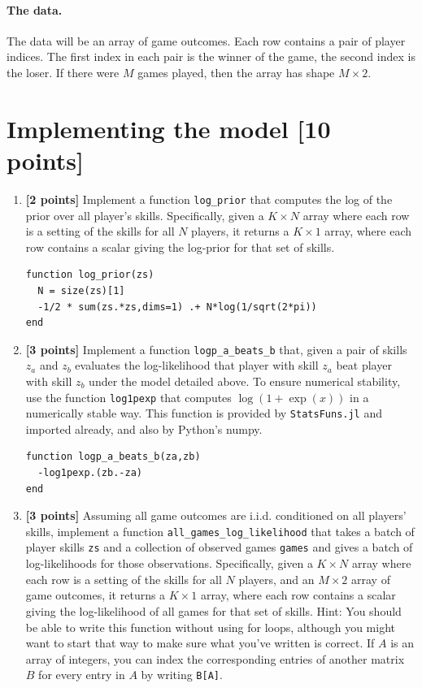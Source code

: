 \documentclass{article}
\begin{document}
\paragraph{The data.}
The data will be an array of game outcomes.
Each row contains a pair of player indices.
The first index in each pair is the winner of the game, the second index is the loser.
If there were $M$ games played, then the array has shape $M \times 2$.

\pagebreak
\section{Implementing the model [10 points]}
\begin{enumerate}[label=(\alph*)]
	\item {\bf [2 points]} Implement a function \texttt{log\_prior} that computes the log of the prior over all player's skills.
          Specifically, given a $K \times N$ array where each row is a setting of the skills for all $N$ players, it returns a $K \times 1$ array, where each row contains a scalar giving the log-prior for that set of skills.

\begin{verbatim}
function log_prior(zs)
  N = size(zs)[1]
  -1/2 * sum(zs.*zs,dims=1) .+ N*log(1/sqrt(2*pi))
end
\end{verbatim}
          
  \item {\bf [3 points]} Implement a function \texttt{logp\_a\_beats\_b} that, given a pair of skills $z_a$ and $z_b$
    evaluates the log-likelihood that player with skill $z_a$ beat player with skill $z_b$ under the model detailed above.
    To ensure numerical stability, use the function  \texttt{log1pexp} that computes $\log(1 + \exp(x))$ in a numerically stable way.
    This function is provided by \texttt{StatsFuns.jl} and imported already, and also by Python's numpy.

\begin{verbatim}
function logp_a_beats_b(za,zb)
  -log1pexp.(zb.-za)
end
\end{verbatim}
    
  \item {\bf [3 points]} Assuming all game outcomes are i.i.d. conditioned on all players' skills, implement a function \texttt{all\_games\_log\_likelihood} that takes a batch of player skills \texttt{zs} and a collection of observed games \texttt{games} and gives a batch of log-likelihoods for those observations.
  Specifically, given a $K \times N$ array where each row is a setting of the skills for all $N$ players, and an $M \times 2$ array of game outcomes, it returns a $K \times 1$ array, where each row contains a scalar giving the log-likelihood of all games for that set of skills.
  Hint: You should be able to write this function without using for loops, although you might want to start that way to make sure what you've written is correct.  If $A$ is an array of integers, you can index the corresponding entries of another matrix $B$ for every entry in $A$ by writing \texttt{B[A]}.


\end{enumerate}
\end{document}
